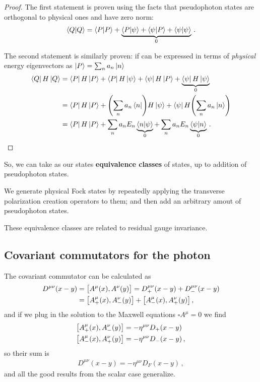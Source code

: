 \documentclass[main.tex]{subfiles}
\begin{document}
\begin{proof}
The first statement is proven using the facts that pseudophoton states are orthogonal to physical ones and have zero norm: 
%
\begin{align}
\braket{Q}{Q} = \braket{P}{P} +
\underbrace{\braket{P}{\psi } +\braket{\psi }{P} + \braket{\psi }{\psi }}_{0}
\,.
\end{align}

The second statement is similarly proven: if can be expressed in terms of \emph{physical} energy eigenvectors as \(\ket{P} = \sum _{n} a_n\ket{n}\)
%
\begin{align}
\bra{Q} H \ket{Q} &= 
\bra{P} H \ket{P} 
+ \bra{P} H \ket{\psi }
+ \bra{\psi } H \ket{P }
+ \underbrace{\bra{\psi } H \ket{\psi }}_{0}  \\
&= 
\bra{P} H \ket{P} 
+ \qty(\sum _{n} a_n \bra{n}) H \ket{\psi }
+ \bra{\psi } H \qty(\sum _{n} a_n \ket{n})  \\
&= \bra{P} H \ket{P} 
+ \sum _{n} a_n E_n \underbrace{\braket{n}{\psi }}_{0}
+ \sum _{n} a_n E_n \underbrace{\braket{\psi }{n }}_{0}
\,.
\end{align}
\end{proof}

So, we can take as our states \textbf{equivalence classes} of states, up to addition of pseudophoton states. 

We generate physical Fock states by repeatedly applying the transverse polarization creation operators to them; and then add an arbitrary amout of pseudophoton states. 

\begin{claim}
These equivalence classes are related to residual gauge invariance.  
\end{claim} 

\subsection{Covariant commutators for the photon}

The covariant commutator can be calculated as 
%
\begin{align}
D^{\mu \nu } (x-y) &= \qty[A^{\mu  }(x), A^{\nu }(y)]  = D^{\mu \nu }_{+}(x-y) + D^{\mu \nu }_{-} (x-y)  \\
&= \qty[A^{\mu }_{+} (x), A^{\nu }_{-}(y)]
+ \qty[A^{\mu }_{-} (x), A^{\nu }_{+}(y)]
\,,
\end{align}
%
and if we plug in the solution to the Maxwell equations \(\square A^{\mu } = 0\) we find 
%
\begin{align}
\qty[A^{\mu }_{+} (x), A^{\nu }_{-}(y)] &= - \eta^{\mu \nu } D_{+}(x-y) \\
\qty[A^{\mu }_{-} (x), A^{\nu }_{+}(y)] &= - \eta^{\mu \nu } D_{-}(x-y)
\,,
\end{align}
%
so their sum is 
%
\begin{align}
D^{\mu \nu } (x-y) = - \eta^{\mu \nu } D_F(x-y)
\,,
\end{align}
%
and all the good results from the scalar case generalize. 
\end{document}
